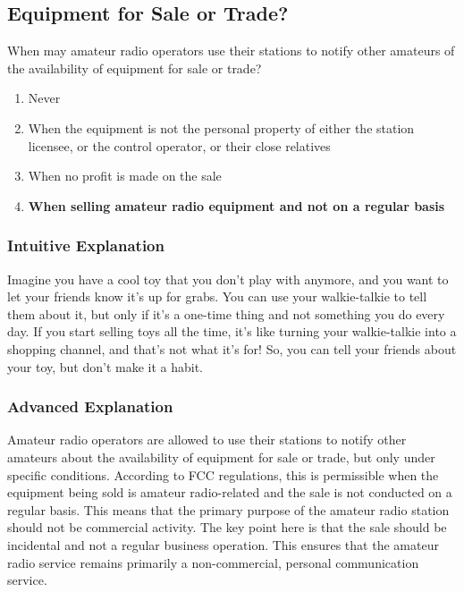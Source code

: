 \subsection{Equipment for Sale or Trade?}
\label{T1D05}

\begin{tcolorbox}[colback=gray!10!white,colframe=black!75!black,title=T1D05]
When may amateur radio operators use their stations to notify other amateurs of the availability of equipment for sale or trade?
\begin{enumerate}[label=\Alph*)]
    \item Never
    \item When the equipment is not the personal property of either the station licensee, or the control operator, or their close relatives
    \item When no profit is made on the sale
    \item \textbf{When selling amateur radio equipment and not on a regular basis}
\end{enumerate}
\end{tcolorbox}

\subsubsection{Intuitive Explanation}
Imagine you have a cool toy that you don't play with anymore, and you want to let your friends know it's up for grabs. You can use your walkie-talkie to tell them about it, but only if it's a one-time thing and not something you do every day. If you start selling toys all the time, it's like turning your walkie-talkie into a shopping channel, and that's not what it's for! So, you can tell your friends about your toy, but don't make it a habit.

\subsubsection{Advanced Explanation}
Amateur radio operators are allowed to use their stations to notify other amateurs about the availability of equipment for sale or trade, but only under specific conditions. According to FCC regulations, this is permissible when the equipment being sold is amateur radio-related and the sale is not conducted on a regular basis. This means that the primary purpose of the amateur radio station should not be commercial activity. The key point here is that the sale should be incidental and not a regular business operation. This ensures that the amateur radio service remains primarily a non-commercial, personal communication service.

